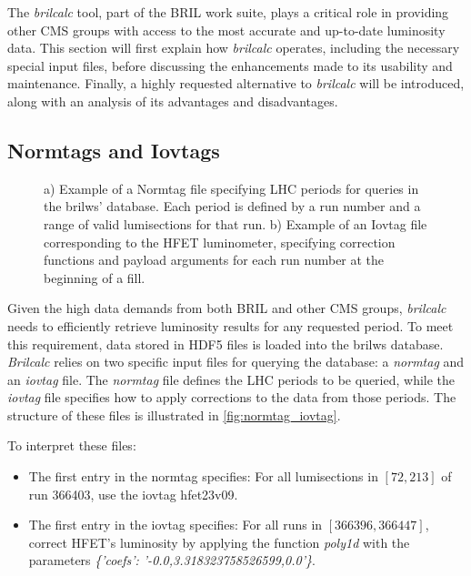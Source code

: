 The \textit{brilcalc} tool, part of the BRIL work suite, plays a critical role in providing other CMS groups with access to the most accurate and up-to-date luminosity data. This section will first explain how \textit{brilcalc} operates, including the necessary special input files, before discussing the enhancements made to its usability and maintenance. Finally, a highly requested alternative to \textit{brilcalc} will be introduced, along with an analysis of its advantages and disadvantages.

\subsection{Normtags and Iovtags}

\begin{figure}[!htb]
	\centering
	\caption[Illustration of iovtag and normtag file structure]{a) Example of a Normtag file specifying LHC periods for queries in the brilws' database. Each period is defined by a run number and a range of valid lumisections for that run. b) Example of an Iovtag file corresponding to the HFET luminometer, specifying correction functions and payload arguments for each run number at the beginning of a fill.}
	\label{fig:normtag_iovtag}
\end{figure}

Given the high data demands from both BRIL and other CMS groups, \textit{brilcalc} needs to efficiently retrieve luminosity results for any requested period. To meet this requirement, data stored in HDF5 files is loaded into the brilws database. \textit{Brilcalc} relies on two specific input files for querying the database: a \textit{normtag} and an \textit{iovtag} file. The \textit{normtag} file defines the LHC periods to be queried, while the \textit{iovtag} file specifies how to apply corrections to the data from those periods. The structure of these files is illustrated in \autoref{fig:normtag_iovtag}.

To interpret these files:
\begin{itemize}
	\item The first entry in the normtag specifies: For all lumisections in $[72, 213]$ of run 366403, use the iovtag hfet23v09.
	\item The first entry in the iovtag specifies: For all runs in $[366396, 366447]$, correct HFET's luminosity by applying the function \textit{poly1d} with the parameters \textit{\{'coefs': '-0.0,3.318323758526599,0.0'\}}.
\end{itemize}

